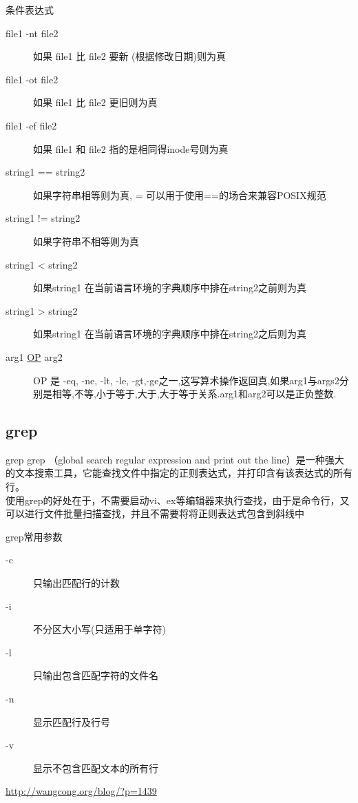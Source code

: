 \begin{frame}[allowframebreaks]{条件表达式}
\begin{description}
\item [file1 -nt file2] 如果 file1 比 file2 要新 (根据修改日期)则为真
\item [file1 -ot file2] 如果 file1 比 file2 更旧则为真
\item [file1 -ef file2]	如果 file1 和 file2 指的是相同得inode号则为真
\item [string1 == string2] 如果字符串相等则为真, = 可以用于使用==的场合来兼容POSIX规范
\item [string1 != string2] 如果字符串不相等则为真
\item [string1 < string2] 如果string1 在当前语言环境的字典顺序中排在string2之前则为真
\item [string1 > string2] 如果string1 在当前语言环境的字典顺序中排在string2之后则为真
\item [arg1 \underline{OP} arg2 ] OP 是 -eq, -ne, -lt, -le, -gt,-ge之一,这写算术操作返回真,如果arg1与args2分别是相等,不等,小于等于,大于,大于等于关系.arg1和arg2可以是正负整数.
\end{description}

\end{frame}

\subsection{grep}

\begin{frame}{grep}
grep （global search regular expression and print out the line）是一种强大的文本搜索工具，它能查找文件中指定的正则表达式，并打印含有该表达式的所有行。\\
使用grep的好处在于，不需要启动vi、ex等编辑器来执行查找，由于是命令行，又可以进行文件批量扫描查找，并且不需要将将正则表达式包含到斜线中
\end{frame}

\begin{frame}{grep常用参数}
\begin{description}
\item [-c ] 只输出匹配行的计数
\item [ -i ] 不分区大小写(只适用于单字符)
\item [ -l ] 只输出包含匹配字符的文件名
\item [ -n ] 显示匹配行及行号
\item [ -v ] 显示不包含匹配文本的所有行
\end{description}
\href{http://wangcong.org/blog/?p=1439}{http://wangcong.org/blog/?p=1439}
\end{frame}


